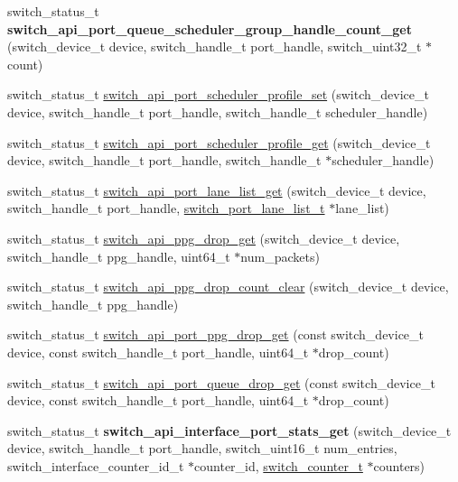 \begin{DoxyCompactItemize}
\item 
\hypertarget{group__Port_ga7dd9d23f6c2ab42963997cec0c550e56}{switch\+\_\+status\+\_\+t {\bfseries switch\+\_\+api\+\_\+port\+\_\+queue\+\_\+scheduler\+\_\+group\+\_\+handle\+\_\+count\+\_\+get} (switch\+\_\+device\+\_\+t device, switch\+\_\+handle\+\_\+t port\+\_\+handle, switch\+\_\+uint32\+\_\+t $\ast$count)}\label{group__Port_ga7dd9d23f6c2ab42963997cec0c550e56}

\item 
switch\+\_\+status\+\_\+t \hyperlink{group__Port_ga80afc4580e5b5fb43fbfb12a0e466121}{switch\+\_\+api\+\_\+port\+\_\+scheduler\+\_\+profile\+\_\+set} (switch\+\_\+device\+\_\+t device, switch\+\_\+handle\+\_\+t port\+\_\+handle, switch\+\_\+handle\+\_\+t scheduler\+\_\+handle)
\item 
switch\+\_\+status\+\_\+t \hyperlink{group__Port_gaf347c04b35bcbed3cc0e114fd19fd966}{switch\+\_\+api\+\_\+port\+\_\+scheduler\+\_\+profile\+\_\+get} (switch\+\_\+device\+\_\+t device, switch\+\_\+handle\+\_\+t port\+\_\+handle, switch\+\_\+handle\+\_\+t $\ast$scheduler\+\_\+handle)
\item 
switch\+\_\+status\+\_\+t \hyperlink{group__Port_ga04df5fc656668c287f597d8989ecdae7}{switch\+\_\+api\+\_\+port\+\_\+lane\+\_\+list\+\_\+get} (switch\+\_\+device\+\_\+t device, switch\+\_\+handle\+\_\+t port\+\_\+handle, \hyperlink{structswitch__port__lane__list__s}{switch\+\_\+port\+\_\+lane\+\_\+list\+\_\+t} $\ast$lane\+\_\+list)
\item 
switch\+\_\+status\+\_\+t \hyperlink{group__Port_gac6ce2cf2532261b6be0220c94f4bd3e5}{switch\+\_\+api\+\_\+ppg\+\_\+drop\+\_\+get} (switch\+\_\+device\+\_\+t device, switch\+\_\+handle\+\_\+t ppg\+\_\+handle, uint64\+\_\+t $\ast$num\+\_\+packets)
\item 
switch\+\_\+status\+\_\+t \hyperlink{group__Port_gaf96e0cd735ba058c331b625105be359c}{switch\+\_\+api\+\_\+ppg\+\_\+drop\+\_\+count\+\_\+clear} (switch\+\_\+device\+\_\+t device, switch\+\_\+handle\+\_\+t ppg\+\_\+handle)
\item 
switch\+\_\+status\+\_\+t \hyperlink{group__Port_ga895dfbe740b64544f9830e98502fd75f}{switch\+\_\+api\+\_\+port\+\_\+ppg\+\_\+drop\+\_\+get} (const switch\+\_\+device\+\_\+t device, const switch\+\_\+handle\+\_\+t port\+\_\+handle, uint64\+\_\+t $\ast$drop\+\_\+count)
\item 
switch\+\_\+status\+\_\+t \hyperlink{group__Port_gadb7e9418491fac9b59325d30fbbedbde}{switch\+\_\+api\+\_\+port\+\_\+queue\+\_\+drop\+\_\+get} (const switch\+\_\+device\+\_\+t device, const switch\+\_\+handle\+\_\+t port\+\_\+handle, uint64\+\_\+t $\ast$drop\+\_\+count)
\item 
\hypertarget{group__Port_gae3b481af5227874000daf29e86eae7e8}{switch\+\_\+status\+\_\+t {\bfseries switch\+\_\+api\+\_\+interface\+\_\+port\+\_\+stats\+\_\+get} (switch\+\_\+device\+\_\+t device, switch\+\_\+handle\+\_\+t port\+\_\+handle, switch\+\_\+uint16\+\_\+t num\+\_\+entries, switch\+\_\+interface\+\_\+counter\+\_\+id\+\_\+t $\ast$counter\+\_\+id, \hyperlink{structswitch__counter__s}{switch\+\_\+counter\+\_\+t} $\ast$counters)}\label{group__Port_gae3b481af5227874000daf29e86eae7e8}


\end{DoxyCompactItemize}
